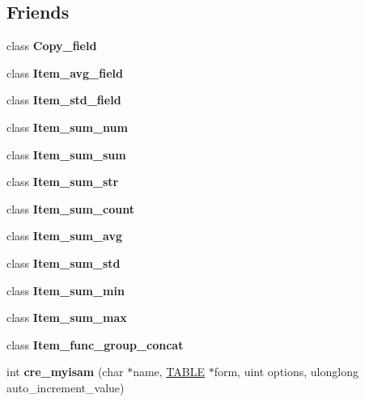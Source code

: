 \subsection*{Friends}
\begin{DoxyCompactItemize}
\item 
\mbox{\label{classField_a0721b133a78cfa8187e88874021cb562}} 
class {\bfseries Copy\+\_\+field}
\item 
\mbox{\label{classField_a8351d47bcf197064d5d72f341dbbbbce}} 
class {\bfseries Item\+\_\+avg\+\_\+field}
\item 
\mbox{\label{classField_a1f4a01c6b0843d355ce8fbb2940b03c3}} 
class {\bfseries Item\+\_\+std\+\_\+field}
\item 
\mbox{\label{classField_ac908a5f546ad797a2930e9109cb981db}} 
class {\bfseries Item\+\_\+sum\+\_\+num}
\item 
\mbox{\label{classField_a2afeb7cbcc97ddd2c3c74cf87352e0ab}} 
class {\bfseries Item\+\_\+sum\+\_\+sum}
\item 
\mbox{\label{classField_a51800218ab4c088c75748aa47a664cdc}} 
class {\bfseries Item\+\_\+sum\+\_\+str}
\item 
\mbox{\label{classField_acfaf1c17289ab0e71cb92e85c6e40ee5}} 
class {\bfseries Item\+\_\+sum\+\_\+count}
\item 
\mbox{\label{classField_a43563950efa7ae2387d3389fae2c0d09}} 
class {\bfseries Item\+\_\+sum\+\_\+avg}
\item 
\mbox{\label{classField_a21e4f904cbf3d776c018f8336eb0a51b}} 
class {\bfseries Item\+\_\+sum\+\_\+std}
\item 
\mbox{\label{classField_ab03b79a7447030080256c1fa9dfd2fbb}} 
class {\bfseries Item\+\_\+sum\+\_\+min}
\item 
\mbox{\label{classField_a0f901d2f5951a5939a1a9b8e2244ce06}} 
class {\bfseries Item\+\_\+sum\+\_\+max}
\item 
\mbox{\label{classField_a09ed89f054e303800fc6753ce33ca6fb}} 
class {\bfseries Item\+\_\+func\+\_\+group\+\_\+concat}
\item 
\mbox{\label{classField_acb339f66b91bde3fd23ccdf87412bdda}} 
int {\bfseries cre\+\_\+myisam} (char $\ast$name, \mbox{\hyperlink{structTABLE}{T\+A\+B\+LE}} $\ast$form, uint options, ulonglong auto\+\_\+increment\+\_\+value)
\end{DoxyCompactItemize}


